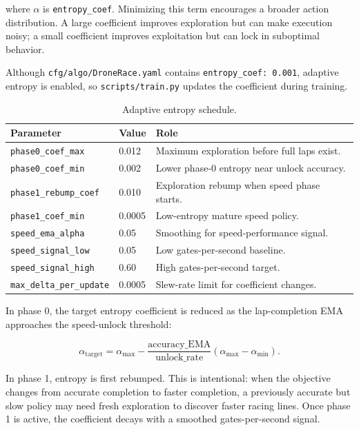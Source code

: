 \documentclass[11pt]{article}
\begin{document}
where \(\alpha\) is \texttt{entropy\_coef}. Minimizing this term encourages a
broader action distribution. A large coefficient improves exploration but can
make execution noisy; a small coefficient improves exploitation but can lock in
suboptimal behavior.

Although \texttt{cfg/algo/DroneRace.yaml} contains
\texttt{entropy\_coef: 0.001}, adaptive entropy is enabled, so
\texttt{scripts/train.py} updates the coefficient during training.

\begin{table}[H]
\centering
\caption{Adaptive entropy schedule.}
\label{tab:entropy}
\begin{tabular}{lll}
\toprule
\textbf{Parameter} & \textbf{Value} & \textbf{Role} \\
\midrule
\texttt{phase0\_coef\_max} & 0.012 & Maximum exploration before full laps exist. \\
\texttt{phase0\_coef\_min} & 0.002 & Lower phase-0 entropy near unlock accuracy. \\
\texttt{phase1\_rebump\_coef} & 0.010 & Exploration rebump when speed phase starts. \\
\texttt{phase1\_coef\_min} & 0.0005 & Low-entropy mature speed policy. \\
\texttt{speed\_ema\_alpha} & 0.05 & Smoothing for speed-performance signal. \\
\texttt{speed\_signal\_low} & 0.05 & Low gates-per-second baseline. \\
\texttt{speed\_signal\_high} & 0.60 & High gates-per-second target. \\
\texttt{max\_delta\_per\_update} & 0.0005 & Slew-rate limit for coefficient changes. \\
\bottomrule
\end{tabular}
\end{table}

In phase 0, the target entropy coefficient is reduced as the lap-completion EMA
approaches the speed-unlock threshold:

\begin{equation}
\alpha_{\mathrm{target}} =
\alpha_{\max}
- \frac{\mathrm{accuracy\_EMA}}{\mathrm{unlock\_rate}}
  (\alpha_{\max}-\alpha_{\min}).
\end{equation}

In phase 1, entropy is first rebumped. This is intentional: when the objective
changes from accurate completion to faster completion, a previously accurate
but slow policy may need fresh exploration to discover faster racing lines. Once
phase 1 is active, the coefficient decays with a smoothed gates-per-second
signal.
\end{document}
